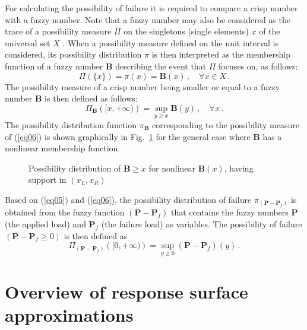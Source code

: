 \documentclass[stropt]{svjour}
\def\b{\mathbf{B}}%
\def\p{\mathbf{P}}%
\begin{document}
For calculating the possibility of failure it is required to compare a crisp
number with a fuzzy number.
Note that a fuzzy number may also be considered as the trace of a possibility
measure $\Pi$ on the singletons (single elements) $x$ of the universal set $X$
\citep[p.~13--17]{Dubois88}.
When a possibility measure defined on the unit interval is considered, its
possibility distribution $\pi$ is then interpreted as the membership function
of a fuzzy number $\b$ describing the event that $\Pi$ focuses on, as follows:
\begin{equation}
\Pi\left( \{ x\}\right)=\pi(x)=\b (x)\, ,\quad \forall x\in X\, . \label{eq05}
\end{equation}
The possibility measure of a crisp number being smaller or equal to a fuzzy
number $\b$ is then defined \cite[pp.~99--101]{Dubois88} as follows:
%
\begin{equation}
\Pi_{\b}\left( [x,+\infty) \right)=\sup_{y\geq x}\b (y)\, ,\quad \forall
x\, . \label{eq06}
\end{equation}
The possibility distribution function $\pi_{\b}$ corresponding to
the possibility measure of (\ref{eq06}) is shown graphically in
Fig.~\ref{fig:2} for the general case where $\b$ has a nonlinear membership
function.

\begin{figure}
\vspace{5cm}
\caption{Possibility distribution of $\b \geq x$ for nonlinear $\b(x)$,
having support in $(x_L, x_R)$}
\label{fig:2}
\end{figure}

Based on (\ref{eq05}) and (\ref{eq06}), the possibility distribution of
failure $\pi_{(\p-\p_f)}$ is obtained from the fuzzy function
$(\p-\p_f)$ that contains the fuzzy numbers $\p$ (the applied load) and $\p_f$
(the failure load) as variables.
The possibility of failure $(\p-\p_f\geq 0)$ is then defined as
\begin{equation}
\Pi_{(\p-\p_f)}\left( [0,+\infty)\right)=\sup_{y\geq 0}(\p-\p_f)(y)\, .
\label{eq07}
\end{equation}


\section{Overview of response surface approximations}
\label{sec03}
\end{document}
